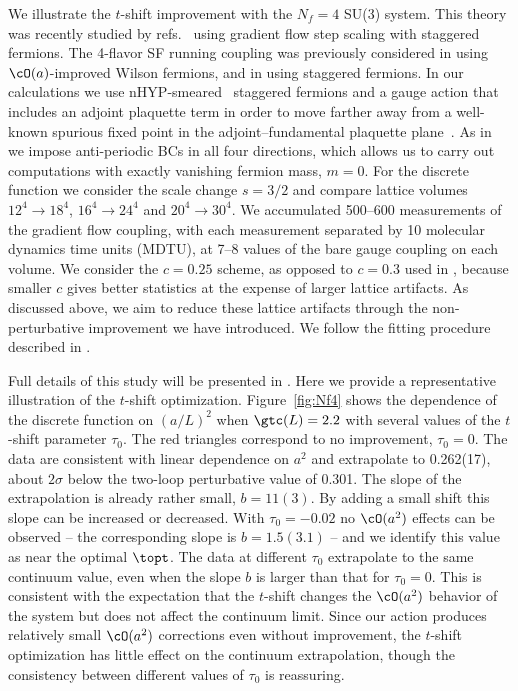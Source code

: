 We illustrate the $t$-shift improvement with the $N_f = 4$ SU(3) system.
This theory was recently studied by refs.~\cite{Fodor:2012td, Fodor:2012qh} using gradient flow step scaling with staggered fermions.
The 4-flavor SF running coupling was previously considered in  using $\cO(a)$-improved Wilson fermions, and in  using staggered fermions.
In our calculations we use nHYP-smeared~\cite{Hasenfratz:2001hp, Hasenfratz:2007rf} staggered fermions and a gauge action that includes an adjoint plaquette term in order to move farther away from a well-known spurious fixed point in the adjoint--fundamental plaquette plane~\cite{Cheng:2011ic}.
As in  we impose anti-periodic BCs in all four directions, which allows us to carry out computations with exactly vanishing fermion mass, $m = 0$.
For the discrete \be function we consider the scale change $s = 3 / 2$ and compare lattice volumes $12^4 \to 18^4$, $16^4 \to 24^4$ and $20^4 \to 30^4$.
We accumulated 500--600 measurements of the gradient flow coupling, with each measurement separated by 10 molecular dynamics time units (MDTU), at 7--8 values of the bare gauge coupling on each volume.
We consider the $c = 0.25$ scheme, as opposed to $c = 0.3$ used in , because smaller $c$ gives better statistics at the expense of larger lattice artifacts.
As discussed above, we aim to reduce these lattice artifacts through the non-perturbative improvement we have introduced.
We follow the fitting procedure described in .

Full details of this study will be presented in .
Here we provide a representative illustration of the $t$-shift optimization.
Figure~\ref{fig:Nf4} shows the dependence of the discrete \be function on $(a / L)^2$ when $\gtc(L) = 2.2$ with several values of the $t$-shift parameter $\tau_0$.
The red triangles correspond to no improvement, $\tau_0 = 0$.
The data are consistent with linear dependence on $a^2$ and extrapolate to 0.262(17), about $2\sigma$ below the two-loop perturbative value of 0.301.
The slope of the extrapolation is already rather small, $b = 11(3)$.
By adding a small shift this slope can be increased or decreased.
With $\tau_0 = -0.02$ no $\cO(a^2)$ effects can be observed -- the corresponding slope is $b = 1.5(3.1)$ -- and we identify this value as near the optimal $\topt$.
The data at different $\tau_0$ extrapolate to the same continuum value, even when the slope $b$ is larger than that for $\tau_0 = 0$.
This is consistent with the expectation that the $t$-shift changes the $\cO(a^2)$ behavior of the system but does not affect the continuum limit.
Since our action produces relatively small $\cO(a^2)$ corrections even without improvement, the $t$-shift optimization has little effect on the continuum extrapolation, though the consistency between different values of $\tau_0$ is reassuring.

